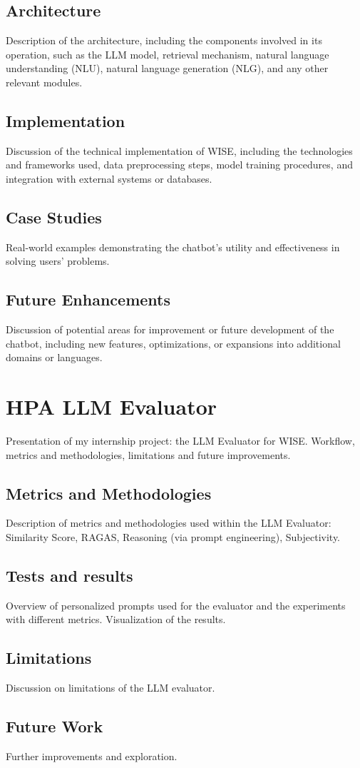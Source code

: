 \subsection{Architecture}
Description of the architecture, including the components involved in its operation, such as the LLM model, retrieval mechanism, natural language understanding (NLU), natural language generation (NLG), and any other relevant modules.

\subsection{Implementation}
Discussion of the technical implementation of WISE, including the technologies and frameworks used, data preprocessing steps, model training procedures, and integration with external systems or databases.

\subsection{Case Studies}
Real-world examples demonstrating the chatbot’s utility and effectiveness in solving users’ problems.

\subsection{Future Enhancements}
Discussion of potential areas for improvement or future development of the chatbot, including new features, optimizations, or expansions into additional domains or languages.

\section{HPA LLM Evaluator}
Presentation of my internship project: the LLM Evaluator for WISE. Workflow, metrics and methodologies, limitations and future improvements.

\subsection{Metrics and Methodologies}
Description of metrics and methodologies used within the LLM Evaluator: Similarity Score, RAGAS, Reasoning (via prompt engineering), Subjectivity.

\subsection{Tests and results}
Overview of personalized prompts used for the evaluator and the experiments with different metrics. Visualization of the results.

\subsection{Limitations}
Discussion on limitations of the LLM evaluator.

\subsection{Future Work}
Further improvements and exploration.
